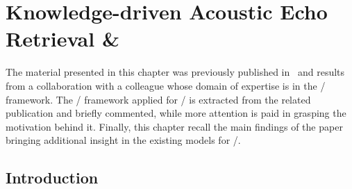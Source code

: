 \chapter{Knowledge-driven Acoustic Echo Retrieval \& }\label{ch:blaster}

 \synopsisChBlaster

\mynewline
The material presented in this chapter was previously published in~\cite{di2020blaster} and results from a collaboration with a colleague whose
domain of expertise is in the \CDdef/ framework.
The \CD/ framework applied for \AER/ is extracted from the related publication and briefly commented, while more attention is paid in grasping the motivation behind it.
Finally, this chapter recall the main findings of the paper bringing additional insight in the existing models for \AER/.

\section{Introduction}
\label{sec:blaster:intro}

